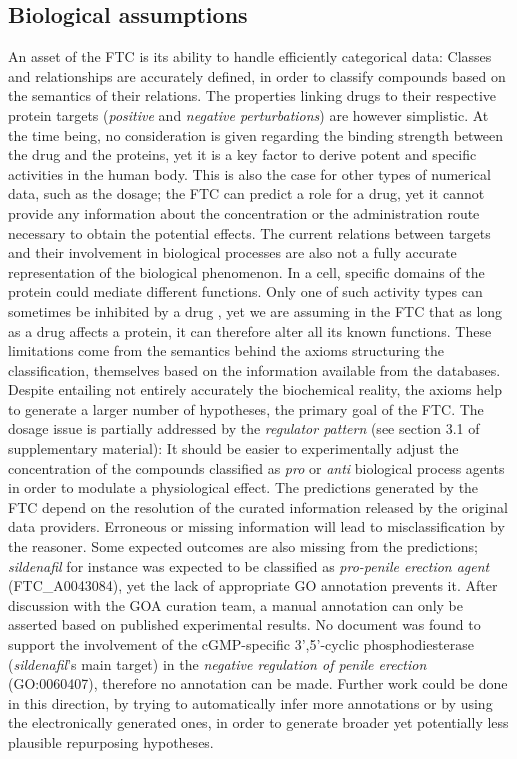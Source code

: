 \documentclass{bioinfo}
\begin{document}
\subsection{Biological assumptions}
An asset of the FTC is its ability to handle efficiently categorical data: Classes and relationships 
are accurately defined, in order to classify compounds based on the semantics of their relations. The properties 
linking drugs to their respective protein targets (\emph{positive} and \emph{negative perturbations}) are however simplistic. At the 
time being, no consideration is given regarding the binding strength between the drug and the proteins, yet it is a key 
factor to derive potent and specific activities in the human body. This is also the case for other types of numerical data, 
such as the dosage; the FTC can predict a role for a drug, yet it cannot provide any information about the concentration or 
the administration route necessary to obtain the potential effects. The current relations between targets and their involvement 
in biological processes are also not a fully accurate representation of the biological phenomenon. In a cell, specific domains 
of the protein could mediate different functions. Only one of such activity types can sometimes be inhibited 
by a drug \citep{kruger}, yet we are assuming in the FTC that as long as a drug affects a protein, 
it can therefore alter all its known functions.
These limitations come from the semantics behind the axioms structuring the classification, themselves based on the 
information available from the databases. Despite entailing not entirely accurately the 
biochemical reality, the axioms help to generate a larger number of hypotheses, the primary goal of the FTC. The dosage 
issue is partially addressed by the \emph{regulator pattern} (see section 3.1 of supplementary material): It should be 
easier to experimentally adjust the concentration of the compounds classified as \emph{pro} or \emph{anti} biological process agents 
in order to modulate a physiological effect.
The predictions generated by the FTC depend on the resolution of the curated information released by 
the original data providers. Erroneous or missing information will lead to misclassification by the reasoner. 
Some expected outcomes are also missing from the predictions; \emph{sildenafil} for instance was expected to be classified 
as \emph{pro-penile erection agent} (FTC\_A0043084), yet the lack of appropriate GO annotation prevents it. After discussion 
with the GOA curation team, a manual annotation can only be asserted based on published experimental results. No document 
was found to support the involvement of the cGMP-specific 3',5'-cyclic phosphodiesterase (\emph{sildenafil}'s main target) 
in the \emph{negative regulation of penile erection} (GO:0060407), therefore no annotation can be made. Further work could be done 
in this direction, by trying to automatically infer more annotations or by using the electronically generated ones, in order 
to generate broader yet potentially less plausible repurposing hypotheses.
\end{document}
